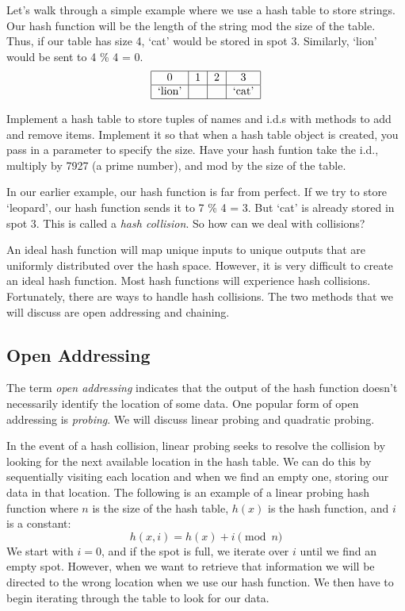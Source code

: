 Let's walk through a simple example where we use a hash table to store strings.
Our hash function will be the length of the string mod the size of the table.
Thus, if our table has size 4, `cat' would be stored in spot 3.
Similarly, `lion' would be sent to 4 \% 4 = 0.
\[
\begin{tabular}{|c|c|c|c|}
\hline
0 & 1 & 2 & 3\\
\hline
`lion' & & & `cat' \\
\hline
\end{tabular}
\]


\begin{problem}
Implement a hash table to store tuples of names and i.d.s with methods to add and remove items.
Implement it so that when a hash table object is created, you pass in a parameter to specify the size.
Have your hash funtion take the i.d., multiply by 7927 (a prime number), and mod by the size of the table.
\label{prob:Hash1}
\end{problem}

In our earlier example, our hash function is far from perfect.
If we try to store `leopard', our hash function sends it to 7 \% 4 = 3.
But `cat' is already stored in spot 3. 
This is called a \emph{hash collision}.
So how can we deal with collisions?

An ideal hash function will map unique inputs to unique outputs that are uniformly distributed over the hash space.
However, it is very difficult to create an ideal hash function. 
Most hash functions will experience hash collisions.
Fortunately, there are ways to handle hash collisions. 
The two methods that we will discuss are open addressing and chaining.

\subsection*{Open Addressing}
The term \emph{open addressing} indicates that the output of the hash function doesn't necessarily identify the location of some data.
One popular form of open addressing is \emph{probing}.
We will discuss linear probing and quadratic probing.

In the event of a hash collision, linear probing seeks to resolve the collision by looking for the next available location in the hash table.
We can do this by sequentially visiting each location and when we find an empty one, storing our data in that location.
The following is an example of a linear probing hash function where $n$ is the size of the hash table, $h(x)$ is the hash function, and $i$ is a constant:
\begin{equation*}
h(x, i) = h(x) + i \pmod{n}
\end{equation*}
We start with $i = 0$, and if the spot is full, we iterate over $i$ until we find an empty spot.
However, when we want to retrieve that information we will be directed to the wrong location when we use our hash function.
We then have to begin iterating through the table to look for our data.

